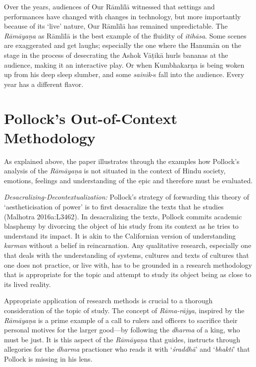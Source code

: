 Over the years, audiences of Our Rāmlīlā witnessed that settings and performances have changed with changes in technology, but more importantly because of its ‘live’ nature, Our Rāmlīlā has remained unpredictable. The \textit{Rāmāyaṇa} as Rāmlīlā is the best example of the fluidity of \textit{itihāsa}. Some scenes are exaggerated and get laughs; especially the one where the Hanumān on the stage in the process of desecrating the Ashok Vāṭikā hurls bananas at the audience, making it an interactive play. Or when Kumbhakarṇa is being woken up from his deep sleep slumber, and some \textit{sainik}-s fall into the audience. Every year has a different flavor.


\section*{Pollock’s Out-of-Context Methodology}

As explained above, the paper illustrates through the examples how Pollock’s analysis of the \textit{Rāmāyaṇa} is not situated in the context of Hindu society, emotions, feelings and understanding of the epic and therefore must be evaluated.

\textit{Desacralizing-Decontextualization:} Pollock’s strategy of forwarding this theory of ‘aestheticisation of power’ is to first desacralize the texts that he studies (Malhotra 2016a:L3462). In desacralizing the texts, Pollock commits academic blasphemy by divorcing the object of his study from its context as he tries to understand its impact. It is akin to the Californian version of understanding \textit{karman} without a belief in reincarnation. Any qualitative research, especially one that deals with the understanding of systems, cultures and texts of cultures that one does not practice, or live with, has to be grounded in a research methodology that is appropriate for the topic and attempt to study its object being as close to its lived reality.

Appropriate application of research methods is crucial to a thorough consideration of the topic of study. The concept of \textit{Rāma-rājya}, inspired by the \textit{Rāmāyaṇa} is a prime example of a call to rulers and officers to sacrifice their personal motives for the larger good—by following the \textit{dharma} of a king, who must be just. It is this aspect of the \textit{Rāmāyaṇa} that guides, instructs through allegories for the \textit{dharma} practioner who reads it with ‘\textit{śraddhā}’ and ‘\textit{bhakti}’ that Pollock is missing in his lens.

